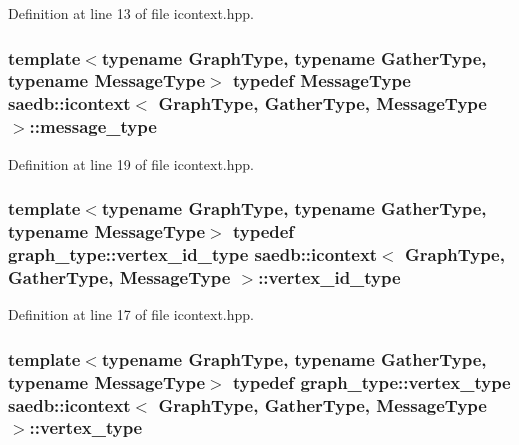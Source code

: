 Definition at line 13 of file icontext.\-hpp.

\hypertarget{classsaedb_1_1icontext_a7bd82d8486ab08dc1adf49dd6d659059}{
\subsubsection[{message\-\_\-type}]{\setlength{\rightskip}{0pt plus 5cm}template$<$typename Graph\-Type, typename Gather\-Type, typename Message\-Type$>$ typedef Message\-Type {\bf saedb\-::icontext}$<$ Graph\-Type, Gather\-Type, Message\-Type $>$\-::{\bf message\-\_\-type}}}\label{d6/d73/classsaedb_1_1icontext_a7bd82d8486ab08dc1adf49dd6d659059}


Definition at line 19 of file icontext.\-hpp.

\hypertarget{classsaedb_1_1icontext_ac130cf374063f27748e4770617971660}{
\subsubsection[{vertex\-\_\-id\-\_\-type}]{\setlength{\rightskip}{0pt plus 5cm}template$<$typename Graph\-Type, typename Gather\-Type, typename Message\-Type$>$ typedef {\bf graph\-\_\-type\-::vertex\-\_\-id\-\_\-type} {\bf saedb\-::icontext}$<$ Graph\-Type, Gather\-Type, Message\-Type $>$\-::{\bf vertex\-\_\-id\-\_\-type}}}\label{d6/d73/classsaedb_1_1icontext_ac130cf374063f27748e4770617971660}


Definition at line 17 of file icontext.\-hpp.

\hypertarget{classsaedb_1_1icontext_ab83a38ba860cb2101b499ae60675e4e5}{
\subsubsection[{vertex\-\_\-type}]{\setlength{\rightskip}{0pt plus 5cm}template$<$typename Graph\-Type, typename Gather\-Type, typename Message\-Type$>$ typedef {\bf graph\-\_\-type\-::vertex\-\_\-type} {\bf saedb\-::icontext}$<$ Graph\-Type, Gather\-Type, Message\-Type $>$\-::{\bf vertex\-\_\-type}}}\label{d6/d73/classsaedb_1_1icontext_ab83a38ba860cb2101b499ae60675e4e5}


